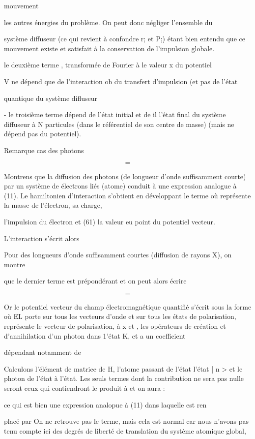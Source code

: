 mouvement

les autres énergies du problème. On peut donc négliger l'ensemble du

système diffuseur (ce qui revient à confondre r; et P;) étant bien entendu
que ce mouvement existe et satisfait à la conservation de l'impulsion globale.

 le deuxième terme , transformée de Fourier à le valeur x du potentiel

V ne dépend que de l'interaction ob du transfert d'impulsion (et pas de l'état

quantique du système difluseur

- le troisième terme  dépend de l'état initial et de
il
l'état final du système diffuseur à N particules (dans le référentiel de son
centre de masse) (mais ne dépend pas du potentiel).

Remarque  cas des photons

\[
\tag{115}=
\]

Montrens que la diffusion des photons (de longueur d'onde suffisamment courte) par
un système de  électrons liés (atome) conduit à une expression analogue à (11).
Le hamiltonien d'interaction s'obtient en développant le terme
 où  représente la masse de l'électron,  sa charge, 

l'impulsion du électron et  (61) la valeur eu point  du potentiel
vecteur.

L'interaction s'écrit alors

Pour des longueurs d'onde suffisamment courtes (diffusion de rayons X), on montre

que le dernier terme est prépondérant et on peut alors écrire

\[
\tag{116}=
\]


Or le potentiel vecteur du champ électromagnétique quantifié s'écrit sous
la forme
où EL porte sur tous les vecteurs d'onde et  sur tous les états de polarisation,
représente le vecteur de polarisation, à x et , les opérateurs
de création et d'annihilation d'un photon dans 1'état K,  et a un coefficient

dépendant notamment de 

Calculons l'élément de matrice de H, l'atome passant de l'état
l'état | n > et le photon de l'état  à l'état.
Les seuls termes dont la contribution ne sera pas nulle seront ceux qui contiendront
le produit  à et on aura :

ce qui est bien une expression analopue à (11) dans laquelle  est ren

placé par On ne retrouve pas le terme, mais cela est
normal car nous n'avons pas tenu compte ici des degrés de liberté de translation
du système atomique global,

